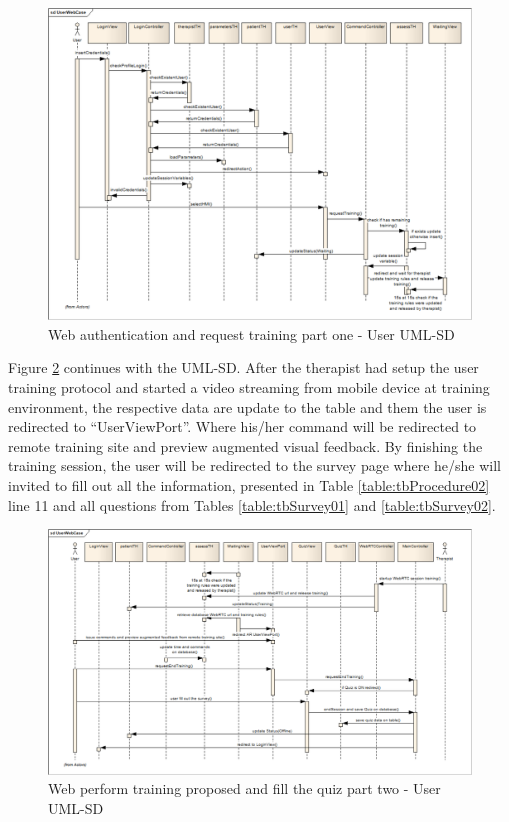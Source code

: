 \begin{figure}[!hbt]
\begin{center}
\includegraphics[width=1 \textwidth]{img/cap4/UMLSD-UserWebCase01}
\caption{Web authentication and request training part one - User UML-SD}
\label{fig:UMLSD-UserWebCase01}
\end{center}
\end{figure} 

Figure \ref{fig:UMLSD-UserWebCase02} continues with the UML-SD. After the therapist had setup the user training protocol and started a video streaming from mobile device at training environment, the respective data are update to the table and them the user is redirected to ``UserViewPort''. Where his/her command will be redirected to remote training site and preview augmented visual feedback. By finishing the training session, the user will be redirected to the survey page where he/she will invited to fill out all the information, presented in Table \ref{table:tbProcedure02} line 11 and all questions from Tables \ref{table:tbSurvey01} and \ref{table:tbSurvey02}.



\begin{figure}[!hbt]
\begin{center}
\includegraphics[width=1 \textwidth]{img/cap4/UMLSD-UserWebCase02}
\caption{Web perform training proposed and fill the quiz part two - User UML-SD}
\label{fig:UMLSD-UserWebCase02}
\end{center}
\end{figure} 


